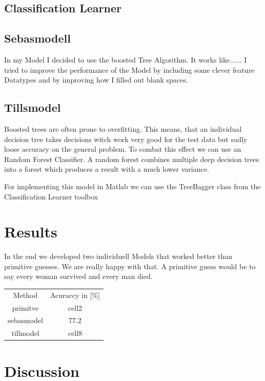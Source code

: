 \documentclass[
   10.5pt,
   invert-title=true,
   titlepage=false,
   titleimage-ratio=13,
   class=article
]{bfhpub}				%
\begin{document}
\subsection*{Classification Learner}

\subsection*{Sebasmodell}
In my Model I decided to use the boosted Tree Algorithm. It works like......
I tried to improve the performance of the Model by including some clever feature Datatypes and by improving how I filled out blank spaces.

\subsection*{Tillsmodel}
Boosted trees are often prone to overfitting. This means, that an individual decision tree takes decisions witch work very good for the test data but sadly loose accuracy on the general problem.
To combat this effect we can use an Random Forest Classifier. A random forest  combines multiple deep decision trees into a forest which produces a result with a much lower variance.

For implementing this model in Matlab we can use the TreeBagger class from the Classification Learner toolbox

\section*{Results}
In the end we developed two individuell Models that worked better than primitive guesses. We are really happy with that. A primitive guess would be to say every woman survived and every man died.

\begin{center}
	\begin{tabular}{ c c }
		Method & Acuraccy in [\%] \\
		primitve & cell2 \\ 
		sebasmodel & 77.2 \\
		tillmodel & cell8    
	\end{tabular}
\end{center}

\section*{Discussion}



\end{document}
